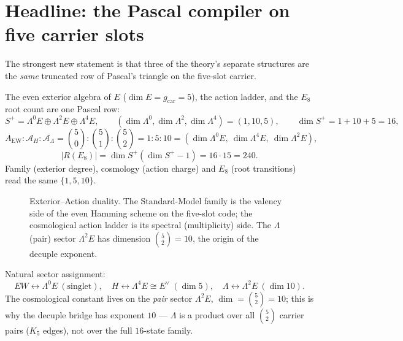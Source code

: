 \documentclass[11pt,a4paper]{article}
\newcommand{\gcar}{g_{\mathrm{car}}}
\newcommand{\AEW}{A_{\mathrm{EW}}}
\newcommand{\AL}{\mathcal A_\Lambda}
\newcommand{\AH}{\mathcal A_H}
\theoremstyle{definition}
\begin{document}
\section{Headline: the Pascal compiler on five carrier slots}

The strongest new statement is that three of the theory's separate structures are the \emph{same}
truncated row of Pascal's triangle on the five-slot carrier.

\begin{keybox}[Family $=$ action ladder $=$ transition count (one Pascal row)]
The even exterior algebra of $E$ ($\dim E=\gcar=5$), the action ladder, and the $E_8$ root count are
one Pascal row:
\[
  S^+=\Lambda^0E\oplus\Lambda^2E\oplus\Lambda^4E,\qquad
  (\dim\Lambda^0,\dim\Lambda^2,\dim\Lambda^4)=(1,10,5),\qquad
  \dim S^+=1+10+5=16,
\]
\[
  \AEW:\AH:\AL=\binom50:\binom51:\binom52=1:5:10
  =(\dim\Lambda^0E,\ \dim\Lambda^4E,\ \dim\Lambda^2E),
\]
\[
  |R(E_8)|=\dim S^+(\dim S^+-1)=16\cdot15=240 .
\]
Family (exterior degree), cosmology (action charge) and $E_8$ (root transitions) read the same
$\{1,5,10\}$. \mE
\end{keybox}

\begin{figure}[ht]
\centering
{}
\caption{Exterior--Action duality. The Standard-Model family is the valency side of the even Hamming
scheme on the five-slot code; the cosmological action ladder is its spectral (multiplicity) side. The
$\Lambda$ (pair) sector $\Lambda^2E$ has dimension $\binom52=10$, the origin of the decuple exponent.}
\label{fig:duality}
\end{figure}

\noindent Natural sector assignment:
\[
  \boxed{\ EW\leftrightarrow\Lambda^0E\ (\text{singlet}),\quad
  H\leftrightarrow\Lambda^4E\cong E^\vee\ (\dim5),\quad
  \Lambda\leftrightarrow\Lambda^2E\ (\dim10).\ }
\]
The cosmological constant lives on the \emph{pair} sector $\Lambda^2E$, $\dim=\binom52=10$; this is
why the decuple bridge has exponent $10$ --- $\Lambda$ is a product over all $\binom52$ carrier pairs
($K_5$ edges), not over the full $16$-state family.
\end{document}
